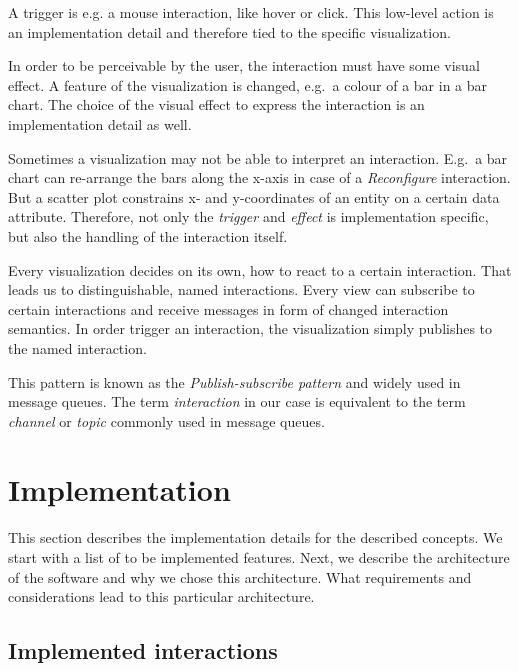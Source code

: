 \documentclass{article}
\begin{document}
A trigger is e.g. a mouse interaction, like hover or click.
This low-level action is an implementation detail and therefore tied to the specific visualization.

In order to be perceivable by the user, the interaction must have some visual effect.
A feature of the visualization is changed, e.g.\ a colour of a bar in a bar chart.
The choice of the visual effect to express the interaction is an implementation detail as well.

Sometimes a visualization may not be able to interpret an interaction.
E.g.\ a bar chart can re-arrange the bars along the x-axis in case of a \emph{Reconfigure} interaction.
But a scatter plot constrains x- and y-coordinates of an entity on a certain data attribute.
Therefore, not only the \emph{trigger} and \emph{effect} is implementation specific, but also the handling of the interaction itself.

Every visualization decides on its own, how to react to a certain interaction.
That leads us to distinguishable, named interactions.
Every view can subscribe to certain interactions and receive messages in form of changed interaction semantics.
In order trigger an interaction, the visualization simply publishes to the named interaction.

This pattern is known as the \emph{Publish-subscribe pattern} and widely used in message queues.
The term \emph{interaction} in our case is equivalent to the term \emph{channel} or \emph{topic} commonly used in message queues.


\clearpage
\section{Implementation}

This section describes the implementation details for the described concepts.
We start with a list of to be implemented features.
Next, we describe the architecture of the software and why we chose this architecture.
What requirements and considerations lead to this particular architecture.


\subsection{Implemented interactions}
\end{document}
